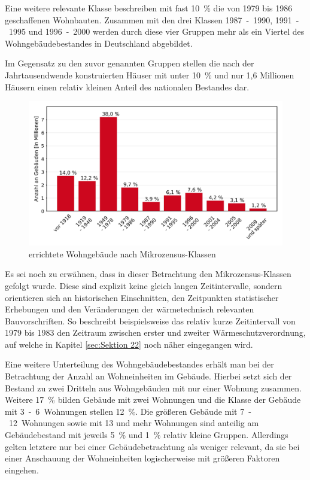 Eine weitere relevante Klasse beschreiben mit fast \mbox{10 \%} die von 1979 bis 1986 geschaffenen Wohnbauten. 
Zusammen mit den drei Klassen \mbox{1987 - 1990,} \mbox{1991 - 1995} und \mbox{1996 - 2000} werden  durch diese vier Gruppen mehr als ein Viertel des Wohngebäudebestandes in Deutschland abgebildet.

Im Gegensatz zu den zuvor genannten Gruppen stellen die nach der Jahrtausendwende konstruierten Häuser mit unter \mbox{10 \%} und nur 1,6 Millionen Häusern einen relativ kleinen Anteil des nationalen Bestandes dar. 

\begin{figure}[H]
	\centering
		\includegraphics{Pictures/GebaeudeAlterDiagramm.jpg}
	\caption{errichtete Wohngebäude nach Mikrozensus-Klassen  	\cite{StatistischeAmterdesBundesundderLander.2014}}
	\label{fig: Abbildung211} 
\end{figure}

Es sei noch zu erwähnen, dass in dieser Betrachtung den Mikrozensus-Klassen gefolgt wurde. 
Diese sind explizit keine gleich langen Zeitintervalle, sondern \glqq orientieren sich an historischen Einschnitten, den Zeitpunkten statistischer Erhebungen und den Veränderungen der wärmetechnisch relevanten Bauvorschriften\grqq \cite{.2015}. 
So beschreibt beispielsweise das relativ kurze Zeitintervall von 1979 bis 1983 den Zeitraum zwischen erster und zweiter Wärmeschutzverordnung, auf welche in Kapitel \ref{sec:Sektion 22} noch näher eingegangen wird.

Eine weitere Unterteilung des Wohngebäudebestandes erhält man bei der Betrachtung der Anzahl an Wohneinheiten im Gebäude. 
Hierbei setzt sich der Bestand zu zwei Dritteln aus Wohngebäuden mit nur einer Wohnung zusammen. 
Weitere \mbox{17 \%} bilden Gebäude mit zwei Wohnungen und die Klasse der Gebäude mit \mbox{3 - 6 Wohnungen} stellen \mbox{12 \%.} 
Die größeren Gebäude mit \mbox{7 - 12 Wohnungen} sowie mit 13 und mehr Wohnungen sind anteilig am Gebäudebestand mit jeweils \mbox{5 \%} und \mbox{1 \%} relativ kleine Gruppen. 
Allerdings gelten letztere nur bei einer Gebäudebetrachtung als weniger relevant, da sie bei einer Anschauung der Wohneinheiten logischerweise mit größeren Faktoren eingehen. \cite{StatistischeAmterdesBundesundderLander.2014b}

